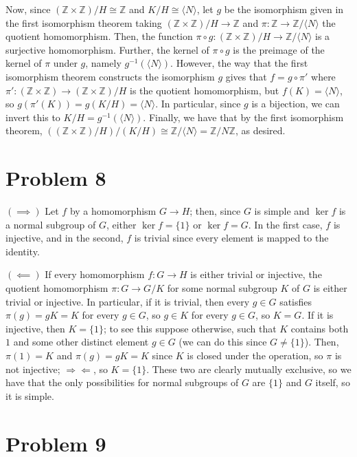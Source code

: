 \documentclass[12pt,letterpaper]{article}
\theoremstyle{definition}
\newcommand{\contra}{\Rightarrow\!\Leftarrow}
\newcommand{\Z}{\mathbb{Z}}
\begin{document}
Now, since $(\Z \times \Z)/H \cong \Z$ and $K/H \cong \langle N \rangle$, let $g$ be the isomorphism given in the first isomorphism theorem taking $(\Z \times \Z)/ H \rightarrow \Z$ and $\pi: \Z \rightarrow \Z / \langle N \rangle$ the quotient homomorphism. Then, the function $\pi \circ g: (\Z \times \Z) / H \rightarrow \Z / \langle N \rangle$ is a surjective homomorphism. Further, the kernel of $\pi \circ g$ is the preimage of the kernel of $\pi$ under $g$, namely $g^{-1}(\langle N \rangle)$. However, the way that the first isomorphism theorem constructs the isomorphism $g$ gives that $f = g \circ \pi'$ where $\pi': (\Z \times \Z) \rightarrow (\Z \times \Z)/H$ is the quotient homomorphism, but $f(K) = \langle N \rangle$, so $g(\pi'(K)) = g(K/H) = \langle N \rangle$. In particular, since $g$ is a bijection, we can invert this to $K/H = g^{-1}(\langle N \rangle)$. Finally, we have that by the first isomorphism theorem, $((\Z \times \Z)/H) / (K/H) \cong \Z / \langle N \rangle = \Z/N\Z$, as desired.


\section*{Problem 8}

$(\implies)$ Let $f$ by a homomorphism $G \rightarrow H$; then, since $G$ is simple and $\ker f$ is a normal subgroup of $G$, either $\ker f = \{1\}$ or $\ker f = G$. In the first case, $f$ is injective, and in the second, $f$ is trivial since every element is mapped to the identity.

$(\impliedby)$ If every homomorphism $f: G \rightarrow H$ is either trivial or injective, the quotient homomorphism $\pi: G \rightarrow G/K$ for some normal subgroup $K$ of $G$ is either trivial or injective. In particular, if it is trivial, then every $g \in G$ satisfies $\pi(g) = gK = K$ for every $g \in G$, so $g \in K$ for every $g \in G$, so $K = G$. If it is injective, then $K = \{1\}$; to see this suppose otherwise, such that $K$ contains both $1$ and some other distinct element $g \in G$ (we can do this since $G \neq \{1\}$). Then, $\pi(1) = K$ and $\pi(g) = gK = K$ since $K$ is closed under the operation, so $\pi$ is not injective; $\contra$, so $K = \{1\}$. These two are clearly mutually exclusive, so we have that the only possibilities for normal subgroups of $G$ are $\{1\}$ and $G$ itself, so it is simple.

\section*{Problem 9}
\end{document}
